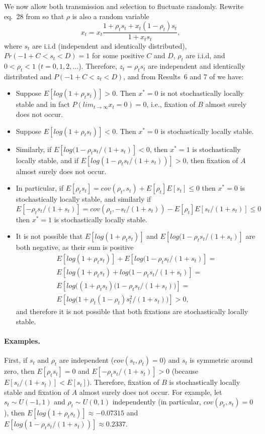 \documentclass[11pt]{extarticle}
\begin{document}
We now allow both transmission and selection to fluctuate randomly.
Rewrite eq.~28 from \citet{Ram2018} so that $\rho$ is also a random variable
\begin{equation}
x_t = x_t \frac{1 + \rho_t s_t + x_t (1 - \rho_t) s_t}{1 + x_t s_t},
\end{equation}
where $s_t$ are i.i.d (independent and identically distributed), $Pr(-1+C<s_t<D)=1$ for some positive $C$ and $D$, $\rho_t$ are i.i.d, and  $0<\rho_t<1$ ($t=0,1,2,\ldots$).
Therefore, $z_t = \rho_t s_t$  are independent and identically distributed and $P(-1+C < z_t < D)$, and from Results~6 and 7 of \citet{Ram2018} we have:
\begin{itemize}
\item Suppose $E[log(1+\rho_t s_t)]>0$. Then $x^*=0$ is not stochastically locally stable and in fact $P(lim_{t \to \infty} x_t=0) = 0$, i.e., fixation of $B$ almost surely does not occur.
\item Suppose $E[log(1+\rho_t s_t)]<0$. Then $x^*=0$ is stochastically locally stable. 
\item Similarly, if $E[log(1-\rho_t s_t/(1+s_t)]<0$, then $x^*=1$ is stochastically locally stable, and if $E[log(1-\rho_t s_t/(1+s_t))]>0$, then fixation of $A$ almost surely does not occur.
\item In particular, if $E[\rho_t s_t] = cov(\rho_t, s_t) + E[\rho_t] E[s_t] \le 0$ then $x^*=0$ is stochastically locally stable, and similarly if $E[-\rho_t s_t/(1+s_t)] = cov(\rho_t, -s_t/(1+s_t)) - E[\rho_t] E[s_t/(1+s_t)] \le 0$ then $x^*=1$ is stochastically locally stable.
\item It is not possible that $E[log(1+\rho_t s_t)]$ and $E[log(1-\rho_t s_t/(1+s_t)]$ are both negative, as their sum is positive
\begin{multline}
E[log(1+\rho_t s_t)] + E[log(1-\rho_t s_t/(1+s_t)] = \\
E[log(1+\rho_t s_t) + log(1-\rho_t s_t/(1+s_t)]= \\
E[log\big((1+\rho_t s_t)(1-\rho_t s_t/(1+s_t)\big)]= \\
E[log\big( 1+\rho_t(1-\rho_t)s_t^2/(1+s_t) \big)] > 0,
\end{multline}
and therefore it is not possible that both fixations are stochastically locally stable.
\end{itemize}

\paragraph{Examples.}
First, if $s_t$ and $\rho_t$ are independent ($cov(s_t, \rho_t)=0$) and $s_t$ is symmetric around zero, then $E[\rho_t s_t]=0$ and $E[-\rho_t s_t/(1+s_t)]>0$ (because $E[s_t/(1+s_t)] < E[s_t]$).
Therefore, fixation of $B$ is stochastically locally stable and fixation of $A$ almost surely does not occur.
For example, let $s_t \sim U(-1, 1)$ and $\rho_t \sim U(0,1)$ independently (in particular, $cov(\rho_t, s_t)=0$), then $E[log(1+\rho_t s_t)]\approx -0.07315$ and $E[log(1-\rho_t s_t/(1+s_t))]\approx 0.2337$.
\end{document}

